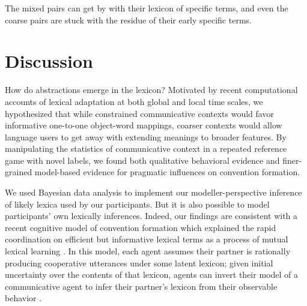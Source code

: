 \documentclass[10pt,letterpaper]{article}
\newcommand{\ndg}[1]{\textcolor{Green}{[ndg: #1]}}
\begin{document}
The mixed pairs can get by with their lexicon of specific terms, and even the coarse pairs are stuck with the residue of their early specific terms. 


\section{Discussion}

How do abstractions emerge in the lexicon? Motivated by recent computational accounts of lexical adaptation at both global and local time scales, we hypothesized that while constrained communicative contexts would favor informative one-to-one object-word mappings, coarser contexts would allow language users to get away with extending meanings to broader features. By manipulating the statistics of communicative context in a repeated reference game with novel labels, we found both qualitative behavioral evidence and finer-grained model-based evidence for pragmatic influences on convention formation.

We used Bayesian data analysis to implement our modeller-perspective inference of likely lexica used by our participants. But it is also possible to model participants' own lexically inferences. Indeed, our findings are consistent with a recent cognitive model of convention formation which explained the rapid coordination on efficient but informative lexical terms as a process of mutual lexical learning \cite{HawkinsFrankGoodman17_ConventionFormation}. %
In this model, each agent assumes their partner is rationally producing cooperative utterances under some latent lexicon; given initial uncertainty over the contents of that lexicon, agents can invert their model of a communicative agent to infer their partner's lexicon from their observable behavior \cite{BergenLevyGoodman16_LexicalUncertainty}. %
\end{document}

